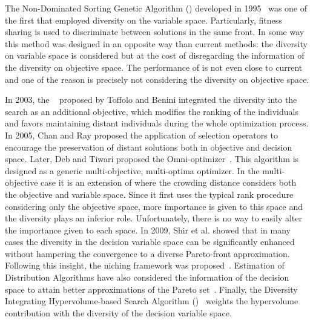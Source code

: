 The Non-Dominated Sorting Genetic Algorithm (\NSGA{}) developed in 1995~\cite{srinivas1994muiltiobjective} 
was one of the first \MOEAS{} that employed diversity on the variable space.
%
Particularly, fitness sharing is used to discriminate between solutions in the same front.
%
%
In some way this method was designed in an opposite way than current methods: the diversity
on variable space is considered but at the cost of disregarding the information of the diversity
on objective space.
%
The performance of \NSGA{} is not even close to current \MOEAS{} and one 
of the reason is precisely not considering the diversity on objective space.

In 2003, the \GDEA{}~\cite{toffolo2003genetic} proposed by Toffolo and Benini integrated the diversity into the search 
as an additional objective, which modifies the ranking of the individuals and favors maintaining distant individuals
during the whole optimization process.
%
In 2005, Chan and Ray \cite{chan2005evolutionary} proposed the application of selection operators to
encourage the preservation of distant solutions both in objective and decision space.
%
%
Later, Deb and Tiwari proposed the Omni-optimizer~\cite{deb2008omni}.
%
This algorithm is designed as a generic multi-objective, multi-optima optimizer. %
%
In the multi-objective case it is an extension of \NSGAII{} where the crowding distance considers both the objective and variable space.
%
Since it first uses the typical rank procedure considering only the objective space, more importance is given to this space 
and the diversity plays an inferior role.
%
Unfortunately, there is no way to easily alter the importance given to each space.
%
In 2009, Shir et al. showed that in many cases the diversity in the decision variable space can be significantly enhanced without hampering 
the convergence to a diverse Pareto-front approximation.
%
Following this insight, the \CMAES{} niching framework was proposed~\cite{shir2009enhancing}.
%
Estimation of Distribution Algorithms have also considered the information of the decision space
to attain better approximations of the Pareto set~\cite{zhou2009approximating}.
%
Finally, the Diversity Integrating Hypervolume-based Search Algorithm (\DIVA{})~\cite{ulrich2010integrating}
weights the hypervolume contribution with the diversity of the decision variable space.

